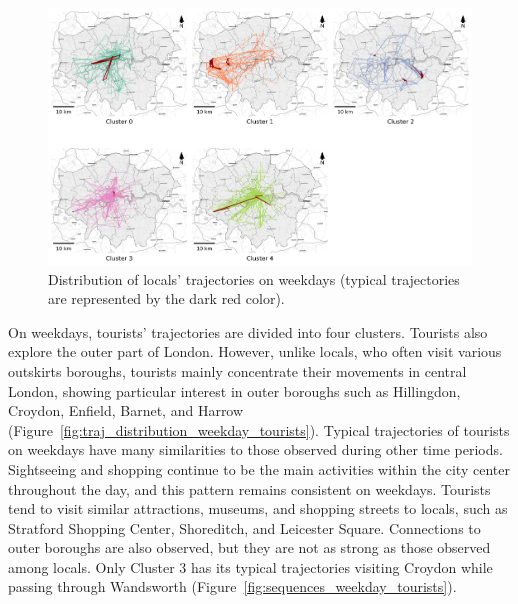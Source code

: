 \documentclass{article}
\theoremstyle{remark}
\begin{document}
\begin{figure}[!h]
\centering
\includegraphics[width=1\textwidth]{figures/traj_distribution_weekday_locals.png}
\caption{\label{fig:traj_distribution_weekday_locals}Distribution of locals' trajectories on weekdays (typical trajectories are represented by the dark red color).}
\end{figure}


On weekdays, tourists' trajectories are divided into four clusters. Tourists also explore the outer part of London. However, unlike locals, who often visit various outskirts boroughs, tourists mainly concentrate their movements in central London, showing particular interest in outer boroughs such as Hillingdon, Croydon, Enfield, Barnet, and Harrow (Figure~\ref{fig:traj_distribution_weekday_tourists}). Typical trajectories of tourists on weekdays have many similarities to those observed during other time periods. Sightseeing and shopping continue to be the main activities within the city center throughout the day, and this pattern remains consistent on weekdays. Tourists tend to visit similar attractions, museums, and shopping streets to locals, such as Stratford Shopping Center, Shoreditch, and Leicester Square. Connections to outer boroughs are also observed, but they are not as strong as those observed among locals. Only Cluster 3 has its typical trajectories visiting Croydon while passing through Wandsworth (Figure~\ref{fig:sequences_weekday_tourists}).
\end{document}
